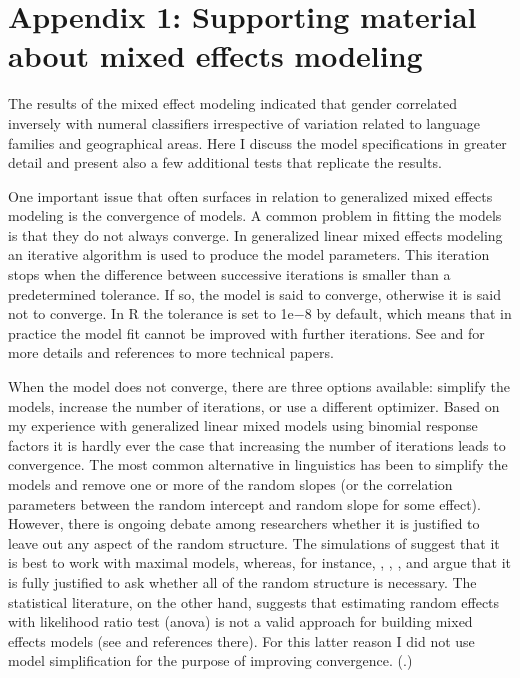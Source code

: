 \documentclass[output=collectionpaper]{langsci/langscibook}
\begin{document}
\section*{Appendix 1: Supporting material about mixed effects modeling}

The results of the mixed effect modeling indicated that gender correlated inversely with numeral classifiers irrespective of variation related to language families and geographical areas. Here I discuss the model specifications in greater detail and present also a few additional tests that replicate the results.

One important issue that often surfaces in relation to generalized mixed effects modeling is the convergence of models. A common problem in fitting the models is that they do not always converge. In generalized linear mixed effects modeling an iterative algorithm is used to produce the model parameters. This iteration stops when the difference between successive iterations is smaller than a predetermined tolerance. If so, the model is said to converge, otherwise it is said not to converge. In R the tolerance is set to 1e${-8}$ by default, which means that in practice the model fit cannot be improved with further iterations. See \citet[2, 9, 10, 31]{Hardin2007} and \citet[3--4]{Kimballsubmitted} for more details and references to more technical papers.

When the model does not converge, there are three options available: simplify the models, increase the number of iterations, or use a different optimizer. Based on my experience with generalized linear mixed models using binomial response factors it is hardly ever the case that increasing the number of iterations leads to convergence. The most common alternative in linguistics has been to simplify the models and remove one or more of the random slopes (or the correlation parameters between the random intercept and random slope for some effect). However, there is ongoing debate among researchers whether it is justified to leave out any aspect of the random structure. The simulations of \citet{Barr2013} suggest that it is best to work with maximal models, whereas, for instance, \citet{Baayen2008a}, \citet[395]{Baayen2008}, \citet{Bates2015a}, and \citet{Gries2015} argue that it is fully justified to ask whether all of the random structure is necessary. The statistical literature, on the other hand, suggests that estimating random effects with likelihood ratio test (anova) is not a valid approach for building mixed effects models (see \citealt[8]{Kimballsubmitted} and references there). For this latter reason I did not use model simplification for the purpose of improving convergence. (\citealt{Kimballsubmitted}.)
\end{document}
